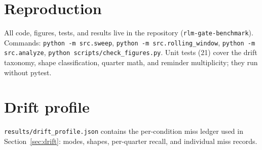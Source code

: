 \documentclass{article}
\begin{document}
\newpage
\appendix

\section{Reproduction}

All code, figures, tests, and results live in the repository
(\texttt{rlm-gate-benchmark}). Commands: \texttt{python -m src.sweep}, \texttt{python
-m src.rolling\_window}, \texttt{python -m src.analyze}, \texttt{python
scripts/check\_figures.py}. Unit tests (21) cover the drift taxonomy, shape
classification, quarter math, and reminder multiplicity; they run without pytest.

\section{Drift profile}

\texttt{results/drift\_profile.json} contains the per-condition miss ledger used in
Section~\ref{sec:drift}: modes, shapes, per-quarter recall, and individual miss
records.
\end{document}

